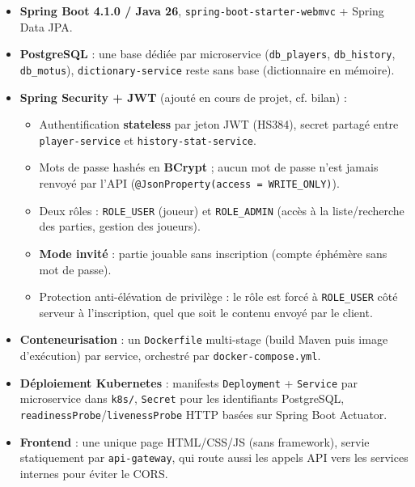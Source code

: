 \documentclass[a4paper,11pt]{article}
\begin{document}
\begin{itemize}
  \item \textbf{Spring Boot 4.1.0 / Java 26}, \texttt{spring-boot-starter-webmvc} + Spring Data JPA.
  \item \textbf{PostgreSQL} : une base d\'edi\'ee par microservice (\texttt{db\_players}, \texttt{db\_history}, \texttt{db\_motus}), \texttt{dictionary-service} reste sans base (dictionnaire en m\'emoire).
  \item \textbf{Spring Security + JWT} (ajout\'e en cours de projet, cf. bilan) :
  \begin{itemize}
    \item Authentification \textbf{stateless} par jeton JWT (HS384), secret partag\'e entre \texttt{player-service} et \texttt{history-stat-service}.
    \item Mots de passe hash\'es en \textbf{BCrypt} ; aucun mot de passe n'est jamais renvoy\'e par l'API (\texttt{@JsonProperty(access = WRITE\_ONLY)}).
    \item Deux r\^oles : \texttt{ROLE\_USER} (joueur) et \texttt{ROLE\_ADMIN} (acc\`es \`a la liste/recherche des parties, gestion des joueurs).
    \item \textbf{Mode invit\'e} : partie jouable sans inscription (compte \'eph\'em\`ere sans mot de passe).
    \item Protection anti-\'el\'evation de privil\`ege : le r\^ole est forc\'e \`a \texttt{ROLE\_USER} c\^ot\'e serveur \`a l'inscription, quel que soit le contenu envoy\'e par le client.
  \end{itemize}
  \item \textbf{Conteneurisation} : un \texttt{Dockerfile} multi-stage (build Maven puis image d'ex\'ecution) par service, orchestr\'e par \texttt{docker-compose.yml}.
  \item \textbf{D\'eploiement Kubernetes} : manifests \texttt{Deployment} + \texttt{Service} par microservice dans \texttt{k8s/}, \texttt{Secret} pour les identifiants PostgreSQL, \texttt{readinessProbe}/\texttt{livenessProbe} HTTP bas\'ees sur Spring Boot Actuator.
  \item \textbf{Frontend} : une unique page HTML/CSS/JS (sans framework), servie statiquement par \texttt{api-gateway}, qui route aussi les appels API vers les services internes pour \'eviter le CORS.
\end{itemize}
\end{document}
